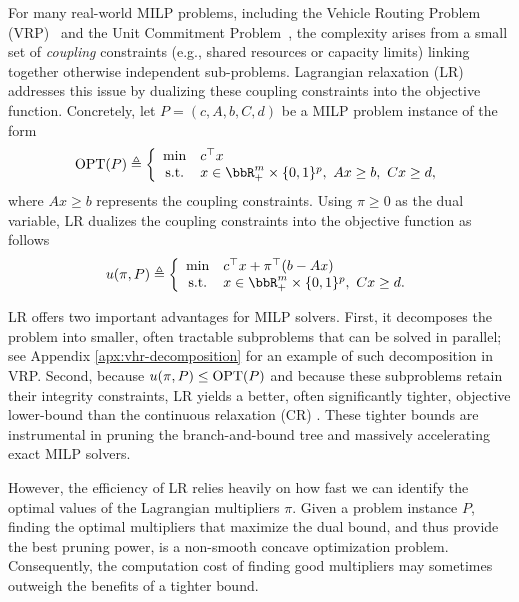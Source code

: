 \documentclass{article}
\theoremstyle{plain}
\theoremstyle{definition}
\theoremstyle{remark}
\begin{document}
For many real-world MILP problems, including the Vehicle Routing Problem (VRP)~\citep{toth2014vehicle} and the Unit Commitment Problem~\citep{saravanan2013solution}, the complexity arises from a small set of \textit{coupling} constraints (e.g., shared resources or capacity limits) linking together otherwise independent sub-problems. Lagrangian relaxation (LR) \citep{fisher1981lagrangian} addresses this issue by dualizing these coupling constraints into the objective function. Concretely, let $P = (c, A, b, C, d)$ be a MILP problem instance of the form 
\begin{equation*}
    \textup{OPT}(P) \triangleq
    \left\{
    \begin{array}{cl}       \min &c^\top x \\
        \text{s.t.} &x\in \bbR_+^{m} \times \{0, 1\}^p,~Ax \geq b,~ Cx \geq d,
    \end{array}
    \right.
\end{equation*}
where $Ax \geq b$ represents the coupling constraints. Using $\pi \ge 0$ as the dual variable, LR dualizes the coupling constraints into the objective function as follows
\begin{equation*} %
u(\pi, P) \triangleq \left\{
    \begin{array}{cl}
        \min &c^\top x + \pi^\top (b - Ax) \\
        \textup{s.t.} &x \in \bbR^m_+ \times \{0, 1\}^p,~Cx \geq d.
     \end{array}
     \right.
\end{equation*}

LR offers two important advantages for MILP solvers. First, it decomposes the problem into smaller, often tractable subproblems that can be solved in parallel; see Appendix \ref{apx:vhr-decomposition} for an example of such decomposition in VRP. Second, because $u(\pi, P)\le\textup{OPT}(P)$ and because these subproblems retain their integrity constraints, LR yields a better, often significantly tighter, objective lower-bound than the continuous relaxation (CR) \citep{geoffrion2009lagrangean}. These tighter bounds are instrumental in pruning the branch-and-bound tree and massively accelerating exact MILP solvers.

However, the efficiency of LR relies heavily on how fast we can identify the optimal values of the Lagrangian multipliers $\pi$. Given a problem instance $P$, finding the optimal multipliers that maximize the dual bound, and thus provide the best pruning power, is a non-smooth concave optimization problem. Consequently, the computation cost of finding good multipliers may sometimes outweigh the benefits of a tighter bound.
\end{document}
